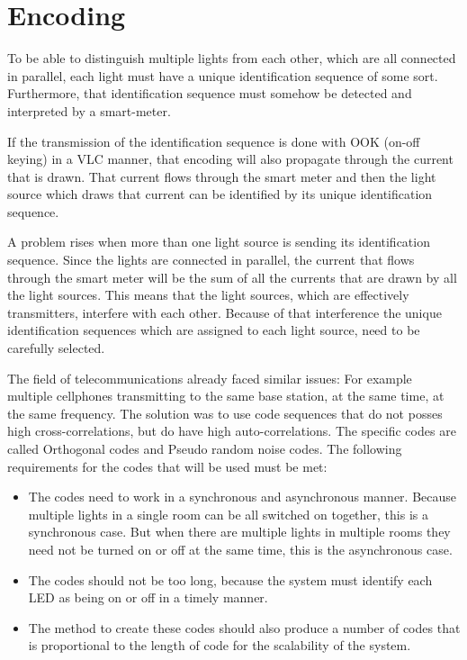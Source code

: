 	\section{Encoding}

	To be able to distinguish multiple lights from each other, which are all connected in parallel, each light must have a unique identification sequence of some sort.
	Furthermore, that identification sequence must somehow be detected and interpreted by a smart-meter.


	If the transmission of the identification sequence is done with OOK (on-off keying) in a VLC manner, that encoding will also propagate through the current that is drawn.
	That current flows through the smart meter and then the light source which draws that current can be identified by its unique identification sequence. 


	A problem rises when more than one light source is sending its identification sequence.
	Since the lights are connected in parallel, the current that flows through the smart meter will be the sum of all the currents that are drawn by all the light sources.
	This means that the light sources, which are effectively transmitters, interfere with each other.
	Because of that interference the unique identification sequences which are assigned to each light source, need to be carefully selected.


	The field of telecommunications already faced similar issues: For example multiple cellphones transmitting to the same base station, at the same time, at the same frequency. 
	The solution was to use code sequences that do not posses high cross-correlations, but do have high auto-correlations.
	The specific codes are called Orthogonal codes and Pseudo random noise codes.
	The following requirements for the codes that will be used must be met:
	\begin{itemize}
		\item The codes need to work in a synchronous and asynchronous manner. Because multiple lights in a single room can be all switched on together, this is a synchronous case.	But when there are multiple lights in multiple rooms they need not be turned on or off at the same time, this is the asynchronous case.

		\item The codes should not be too long, because the system must identify each LED as being on or off in a timely manner.

		\item The method to create these codes should also produce a number of codes that is proportional to the length of code for the scalability of the system.
	\end{itemize}
	

